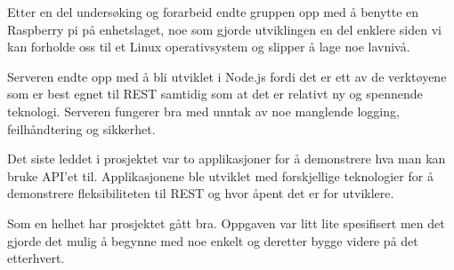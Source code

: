 \documentclass[12pt]{report}
\begin{document}
Etter en del undersøking og forarbeid endte gruppen opp med å benytte en Raspberry pi på enhetslaget, noe som gjorde utviklingen en del enklere siden vi kan forholde oss til et Linux operativsystem og slipper å lage noe lavnivå.

Serveren endte opp med å bli utviklet i Node.js fordi det er ett av de verktøyene som er best egnet til REST samtidig som at det er relativt ny og spennende teknologi. Serveren fungerer bra med unntak av noe manglende logging, feilhåndtering og sikkerhet.

Det siste leddet i prosjektet var to applikasjoner for å demonstrere hva man kan bruke API’et til. Applikasjonene ble utviklet med forskjellige teknologier for å demonstrere fleksibiliteten til REST og hvor åpent det er for utviklere.

Som en helhet har prosjektet gått bra. Oppgaven var litt lite spesifisert men det gjorde det mulig å begynne med noe enkelt og deretter bygge videre på det etterhvert. \cite{bar}






\clearpage

\medskip
\end{document}
